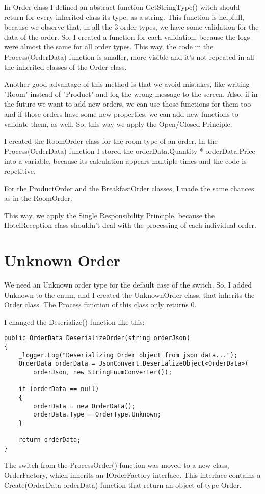 \documentclass[12pt, a4paper]{scrartcl}
\begin{document}
In Order class I defined an abstract function GetStringType() witch should return for every 
inherited class its type, as a string. This function is helpfull, because we observe that,
in all the 3 order types, we have some validation for the data of the order. So, I created 
a function for each validation, because the logs were almost the same for all order types. 
This way, the code in the Process(OrderData) function is smaller,
more visible and it's not repeated in all the inherited classes of the Order class.

Another good advantage of this method is 
that we avoid mistakes, like writing "Room" instead of "Product" and log the wrong message 
to the screen. Also, if in the future we want to add new orders, we can use those functions 
for them too and if those orders have some new properties, we can add new functions 
to validate them, as well. So, this way we apply the Open/Closed Principle.

I created the RoomOrder class for the room type of an order. In the Process(OrderData) function 
I stored the orderData.Quantity * orderData.Price into a variable, because its calculation
appears multiple times and the code is repetitive. 

For the ProductOrder and the BreakfastOrder classes, I made the same chances as in the RoomOrder. 

This way, we apply the Single Responsibility Principle, because the HotelReception class
shouldn't deal with the processing of each individual order. 

\section{Unknown Order}

We need an Unknown order type for the default case of the switch. So, I added Unknown to the enum,
and I created the UnknownOrder class, that inherits the Order class. The Process function
of this class only returns 0.

I changed the Deserialize() function like this:

\begin{lstlisting}
public OrderData DeserializeOrder(string orderJson)
{
    _logger.Log("Deserializing Order object from json data...");
    OrderData orderData = JsonConvert.DeserializeObject<OrderData>(
        orderJson, new StringEnumConverter());
    
    if (orderData == null) 
    { 
        orderData = new OrderData();
        orderData.Type = OrderType.Unknown;
    }
    
    return orderData;
}
\end{lstlisting}

The switch from the ProcessOrder() function was moved to a new class, OrderFactory, which 
inherits an IOrderFactory interface. This interface contains a Create(OrderData orderData)
function that return an object of type Order. 
\end{document}
